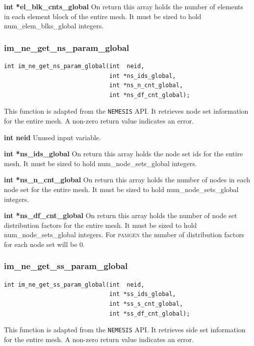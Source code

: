 {\setlength{\parindent}{0pt}
 \textbf{int *el\_blk\_cnts\_global} On return this array holds the number of elements in each element block of the entire mesh. It must be sized to hold num\_elem\_blks\_global integers.}



\subsubsection{im\_ne\_get\_ns\_param\_global}
{\ttfamily  \begin{verbatim}
int im_ne_get_ns_param_global(int  neid,	
                              int *ns_ids_global,
                              int *ns_n_cnt_global,
                              int *ns_df_cnt_global);
\end{verbatim}}
This function is adapted from the \texttt{NEMESIS} API. It retrieves node set information for the entire mesh. A non-zero return value indicates an error.

{\setlength{\parindent}{0pt}
 \textbf{int neid} Unused input variable.}

{\setlength{\parindent}{0pt}
 \textbf{int *ns\_ids\_global} On return this array holds the node set ids for the entire mesh. It must be sized to hold num\_node\_sets\_global integers.}

{\setlength{\parindent}{0pt}
 \textbf{int *ns\_n\_cnt\_global} On return this array holds the number of nodes in each node set for the entire mesh. It must be sized to hold num\_node\_sets\_global integers.}

{\setlength{\parindent}{0pt}
 \textbf{int *ns\_df\_cnt\_global} On return this array holds the number of node set distribution factors for the entire mesh. It must be sized to hold num\_node\_sets\_global integers. For \textsc{pamgen} the number of distribution factors for each node set will be 0.}



\subsubsection{im\_ne\_get\_ss\_param\_global}
{\ttfamily  \begin{verbatim}
int im_ne_get_ss_param_global(int  neid,	
                              int *ss_ids_global,
                              int *ss_s_cnt_global,
                              int *ss_df_cnt_global);
\end{verbatim}}
This function is adapted from the \texttt{NEMESIS} API. It retrieves side set information for the entire mesh. A non-zero return value indicates an error.

